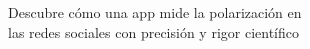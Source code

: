 \documentclass[preview]{standalone}
\begin{document}
\begin{center}
Descubre cómo una app mide la polarización en\\las redes sociales con precisión y rigor científico
\end{center}
\end{document}
